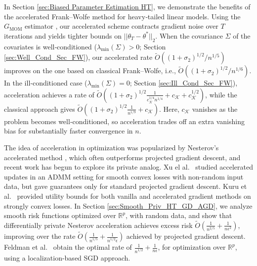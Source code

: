 \documentclass{article}
\begin{document}
In Section \ref{sec:Biased Parameter Estimation HT}, we demonstrate the benefits of the accelerated Frank–Wolfe method for heavy‐tailed linear models. Using the $G_{\mathrm{MOM}}$ estimator \cite{RE}, our accelerated scheme contracts gradient noise over $T$ iterations and yields tighter bounds on $||\theta_T-\theta^*||_2$.
When the covariance $\Sigma$ of the covariates is well‐conditioned ($\lambda_{\min}(\Sigma)>0$; Section \ref{sec:Well_Cond_Sec_FW}), our accelerated rate $\widetilde{O}\left((1 + \sigma_2)^{1/2}/n^{1/5}\right)$ improves on the one based on classical Frank–Wolfe, i.e., $\widetilde{O}\left((1 + \sigma_2)^{1/2}/n^{1/6}\right)$. In the ill‐conditioned case ($\lambda_{\min}(\Sigma)=0$; Section \ref{sec:Ill_Cond_Sec_FW}), acceleration achieves a rate of $\widetilde{O}\left((1 + \sigma_2)^{1/2}\frac{1}{c_{\mathcal{K}}^{1/4}n^{1/4}} + c_{\mathcal{K}} + c_{\mathcal{K}}^{1/2}\right)$, while the classical approach gives $\widetilde{O}\left((1 + \sigma_2)^{1/2}\frac{1}{n^{1/9}} + c_{\mathcal{K}}\right)$. Here, $c_{\mathcal K}$ vanishes as the problem becomes well‐conditioned, so acceleration trades off an extra vanishing bias for substantially faster convergence in $n$.

The idea of acceleration in optimization was popularized by
Nesterov’s accelerated method \cite{Nester}, which often outperforms projected gradient descent, and recent work has begun to explore its private analog. Xu el al.~\cite{Xu_ADMM_Nester_2021} studied accelerated updates in an ADMM setting for smooth convex losses with non-random input data, but gave guarantees only for standard projected gradient descent. Kuru et al.~\cite{Kuru_Nester_DP_2022} provided utility bounds for both vanilla and accelerated gradient methods on strongly convex losses. In Section \ref{sec:Smooth_Priv_HT_GD_AGD}, we analyze smooth risk functions optimized over $\mathbb{R}^p$, with random data, and show that differentially private Nesterov acceleration achieves excess risk $\widetilde{O}\left(\frac{1}{n^{2/5}} + \frac{1}{n\epsilon^2}\right)$, improving over the rate $\widetilde{O}\left(\frac{1}{n^{1/5}} + \frac{1}{n^{1/2}\epsilon}\right)$ achieved by projected gradient descent. Feldman et al.~\cite{SCO_Feldman_2020} obtain the optimal rate of $\frac{1}{n^{1/2}} + \frac{1}{n\epsilon}$, for optimization over $\mathbb{R}^p$, using a localization-based SGD approach.
\end{document}
